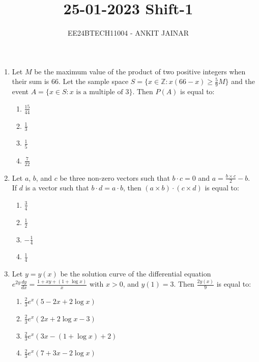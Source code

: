 \documentclass[journal,12pt,onecolumn]{IEEEtran}
\theoremstyle{remark}
\begin{document}

\vspace{3cm}

\title{\textbf{25-01-2023 Shift-1}}
\author{EE24BTECH11004 - ANKIT JAINAR}
\maketitle
\bigskip

\renewcommand{\thefigure}{\theenumi}
\renewcommand{\thetable}{\theenumi}
\setlength{\columnsep}{2.5em}
\begin{enumerate}
\item Let $M$ be the maximum value of the product of two positive integers when their sum is 66. Let the sample space $S = \{ x \in \mathbb{Z} : x(66 - x) \geq \frac{5}{9}M \}$ and the event $A = \{ x \in S : x \text{ is a multiple of } 3 \}$. Then $P(A)$ is equal to:
\begin{enumerate}
    \item $\frac{15}{44}$
    \item $\frac{1}{3}$
    \item $\frac{1}{5}$
    \item $\frac{7}{22}$
\end{enumerate}

\item Let $a$, $b$, and $c$ be three non-zero vectors such that $b \cdot c = 0$ and $a = \frac{b \times c}{2} - b$. If $d$ is a vector such that $b \cdot d = a \cdot b$, then $(a \times b) \cdot (c \times d)$ is equal to:
            \begin{enumerate}
                \item $\frac{3}{4}$
                \item $\frac{1}{2}$
                \item $-\frac{1}{4}$
                \item $\frac{1}{4}$
            \end{enumerate}
        
\item Let $y = y(x)$ be the solution curve of the differential equation 
$e^{2y} \frac{dy}{dx} = \frac{1 + xy + (1 + \log x)}{x}$ 
with $x > 0$, and $y(1) = 3$. Then $\frac{2y(x)}{9}$ is equal to:

\begin{enumerate}
    \item $\frac{2}{3} e^x (5 - 2x + 2 \log x)$
    \item $\frac{2}{3} e^x (2x + 2 \log x - 3)$
    \item $\frac{2}{3} e^x (3x - (1 + \log x) + 2)$
    \item $\frac{2}{3} e^x (7 + 3x - 2 \log x)$
\end{enumerate}


\end{enumerate}
\end{document}
